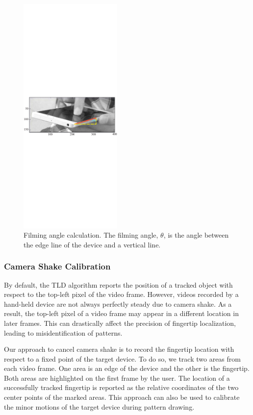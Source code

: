 \begin{figure}[!t]
    \centering
    \includegraphics[width=0.45\textwidth]{fig/line_detection.pdf}
    \caption{Filming angle calculation. The filming angle, $\theta$, is the angle between the edge line of the device and a vertical line.}
    \label{fig:line_detection}
    \vspace{-5mm}
\end{figure}

        \subsubsection{Camera Shake Calibration}
        \label{secction:shake}
         By default, the TLD algorithm reports the position of a tracked object with respect to the top-left pixel of the video frame.
         However, videos recorded by a hand-held device are not always perfectly steady due to
        camera shake. As a result, the top-left pixel of a video frame may appear in a different location in later frames.
        This can drastically affect the precision of fingertip localization, leading to misidentification of patterns.

        Our approach to cancel camera shake is to record the fingertip
        location with respect to a fixed point of the target device. To do so, we track two
        areas from each video frame. One area is an edge of the device and
        the other is the fingertip. Both areas are highlighted on the
        first frame by the user.
        The location of a successfully tracked fingertip is reported as
        the relative coordinates of the two center points of the marked areas.
        This approach can also be used to calibrate the minor motions of the target device during pattern drawing.

